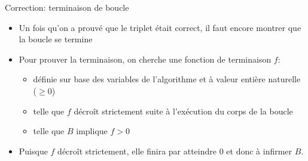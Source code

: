 \begin{frame}{Correction: terminaison de boucle}

\begin{center}\footnotesize
{}
\end{center}

\begin{itemize}
\item Un fois qu'on a prouvé que le triplet était correct, il faut encore montrer que la boucle se termine
\item Pour prouver la terminaison, on cherche une fonction de
  terminaison $f$:
\begin{itemize}
\item définie sur base des variables de l'algorithme et à valeur entière naturelle ($\geq 0$)
\item telle que $f$ décroît strictement suite à l'exécution du corps de la boucle
\item telle que $B$ implique $f>0$
\end{itemize}
\item Puisque $f$ décroît strictement, elle finira par atteindre 0 et donc à infirmer $B$.
\end{itemize}
\end{frame}

